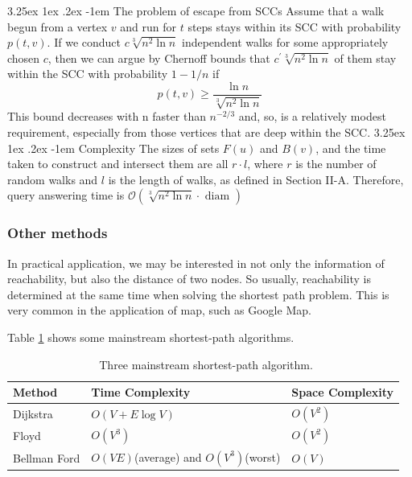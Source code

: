 \documentclass[11pt]{article}
\makeatletter
\renewcommand\paragraph{\@startsection{paragraph}{5}{\z@}%
	{3.25ex \@plus1ex \@minus.2ex}%
	{-1em}%
	{\normalfont\normalsize\bfseries}}
\makeatother
\begin{document}
\paragraph{The problem of escape from SCCs}  {
	Assume that a walk begun from a vertex $v$ and run for $t$ steps stays within its SCC with probability $p(t,v)$. If we conduct $c \sqrt[3]{n^{2} \ln n}$ independent walks for some appropriately chosen $c$, then we can argue by Chernoff bounds that $c^{\prime} \sqrt[3]{n^{2} \ln n}$ of them stay within the SCC with probability $1-1 / n$ if
	$$
	p(t, v) \geq \frac{\ln n}{\sqrt[3]{n^{2} \ln n}}
	$$
	This bound decreases with n faster than $n^{-2/3}$ and, so, is a relatively modest requirement, especially from those vertices that are deep within the SCC.
}
\paragraph{Complexity} {
	The sizes of sets $F(u)$ and $B(v)$, and the time taken to construct and intersect them are all $r\cdot l$, where $r$ is the number of random walks and $l$ is the length of walks, as defined in Section II-A. Therefore, query answering time is $\mathcal{O}\left(\sqrt[3]{n^{2} \ln n} \cdot \text { diam }\right)$
}

\subsubsection{Other methods}
In practical application, we may be interested in not only the information of reachability, but also the distance of two nodes. So usually, reachability is determined at the same time when solving the shortest path problem. This is very common in the application of map, such as Google Map.

Table \ref{table:shortest-path} shows some mainstream shortest-path algorithms.
\begin{table}[H]
	\centering
	\caption{\newline \ Three mainstream shortest-path algorithm.}
	\begin{tabular}{l|l|l}
		\toprule
		Method & Time Complexity & Space Complexity  \\ \midrule
		Dijkstra&  $O(V+E\log{V})$   &$O(V^2)$  \\ \midrule
		Floyd&   $O(V^3)$      & $O(V^2)$ \\ \midrule
		Bellman Ford& $O(VE)$(average) and $O(V^3)$(worst)&$O(V)$\\ \bottomrule
	\end{tabular}
	\label{table:shortest-path}
\end{table}
\end{document}
